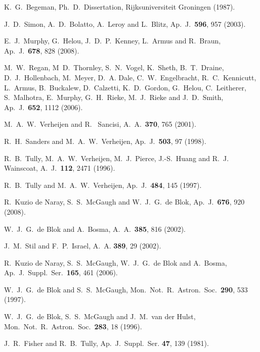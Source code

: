 \documentclass[preprint,aps]{revtex4}
\begin{document}
\begin{thebibliography}{}
 K.~G.~Begeman, Ph.~D.~Dissertation, Rijksuniversiteit Groningen (1987).

 J.~D.~Simon, A.~D.~Bolatto, A.~Leroy and L.~Blitz, Ap.~J.~{\bf 596}, 957 (2003).

 E.~J.~Murphy, G.~Helou, J.~D.~P.~Kenney, L.~Armus and R.~Braun, 
Ap.~J.~{\bf 678}, 828 (2008).

 M.~W.~Regan, M~D.~Thornley, S.~N.~Vogel, K.~Sheth, B.~T.~Draine,
D.~J.~Hollenbach, M.~Meyer, D.~A. Dale, C.~W.~Engelbracht,
R.~C.~Kennicutt, L.~Armus, B.~Buckalew, D.~Calzetti,
K.~D.~Gordon, G.~Helou, C.~Leitherer, S.~Malhotra,
E.~Murphy, G.~H.~Rieke, M.~J.~Rieke and J.~D.~Smith, Ap.~J.~{\bf 652}, 1112 (2006).





 M.~A.~W.~Verheijen and R.~ Sancisi, A.~A.~{\bf  370}, 765 (2001).

 R.~H.~Sanders and M.~A.~W.~Verheijen, Ap.~J.~{\bf 503}, 97 (1998).


 R.~B.~Tully, M.~A.~W.~Verheijen, M.~J.~Pierce, J.-S.~Huang and R.~J.~ Wainscoat, A.~J.~{\bf 112},  2471 (1996).

  R.~B.~Tully and M.~A.~W.~Verheijen, Ap.~J.~{\bf 484}, 145 (1997).





 R.~Kuzio de Naray, S.~S.~McGaugh and  W.~J.~G.~de Blok, Ap.~J.~{\bf 676}, 920 (2008).

 W.~J.~G.~de Blok and A.~Bosma, A.~A.~{\bf 385}, 816 (2002).

 J.~M.~Stil and F.~P.~Israel, A.~A. {\bf  389}, 29 (2002).

 R.~Kuzio de Naray, S.~S.~McGaugh, W.~J.~G.~de Blok and A.~Bosma, Ap.~J.~Suppl.~Ser.~{\bf 165}, 461 (2006).



 W.~J.~G.~de Blok and S.~S.~McGaugh, Mon.~Not.~R.~Astron.~Soc.~{\bf 290}, 533 (1997).

 W.~J.~G.~de Blok, S.~S.~McGaugh and J.~M.~van der Hulst,
Mon.~Not.~R.~Astron.~Soc.~{\bf 283}, 18 (1996).

 J.~R.~Fisher and R.~B.~Tully, Ap.~J.~Suppl.~Ser. {\bf 47}, 139 (1981).





\end{thebibliography}
\end{document}
